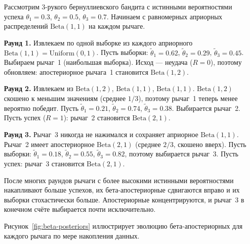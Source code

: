\begin{example}
\label{ex:thompson-worked}
Рассмотрим $3$-рукого бернуллиевского бандита с истинными вероятностями успеха $\theta_1=0.3$, $\theta_2=0.5$, $\theta_3=0.7$.  Начинаем с равномерных априорных распределений $\mathrm{Beta}(1,1)$ на каждом рычаге.

\textbf{Раунд 1.}  Извлекаем по одной выборке из каждого априорного $\mathrm{Beta}(1,1)=\mathrm{Uniform}(0,1)$.  Пусть выборки: $\tilde\theta_1=0.62$, $\tilde\theta_2=0.29$, $\tilde\theta_3=0.45$.  Выбираем рычаг~1 (наибольшая выборка).  Исход — неудача ($R=0$), поэтому обновляем: апостериорное рычага~1 становится $\mathrm{Beta}(1,2)$.

\textbf{Раунд 2.}  Извлекаем из $\mathrm{Beta}(1,2)$, $\mathrm{Beta}(1,1)$, $\mathrm{Beta}(1,1)$.  $\mathrm{Beta}(1,2)$ скошено к меньшим значениям (среднее $1/3$), поэтому рычаг~1 теперь менее вероятно победит.  Пусть $\tilde\theta_1=0.21$, $\tilde\theta_2=0.74$, $\tilde\theta_3=0.38$.  Выбирается рычаг~2.  Пусть успех ($R=1$): рычаг~2 становится $\mathrm{Beta}(2,1)$.

\textbf{Раунд 3.}  Рычаг~3 никогда не нажимался и сохраняет априорное $\mathrm{Beta}(1,1)$.  Рычаг~2 имеет апостериорное $\mathrm{Beta}(2,1)$ (среднее $2/3$, скошено вверх).  Пусть выборки: $\tilde\theta_1=0.18$, $\tilde\theta_2=0.55$, $\tilde\theta_3=0.82$, поэтому выбирается рычаг~3.  Пусть успех: рычаг~3 становится $\mathrm{Beta}(2,1)$.

После многих раундов рычаги с более высокими истинными вероятностями накапливают больше успехов, их бета-апостериорные сдвигаются вправо и их выборки стохастически больше.  Апостериорные концентрируются, и рычаг~3 в конечном счёте выбирается почти исключительно.
\end{example}

Рисунок~\ref{fig:beta-posteriors} иллюстрирует эволюцию бета-апостериорных для каждого рычага по мере накопления данных.

